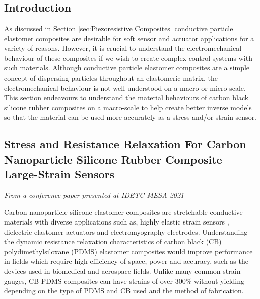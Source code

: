 \chapter{\chapiiiname}
\label{chapter3}



\section{Introduction}
As discussed in Section \ref{sec:Piezoresistive Composites} conductive particle elastomer composites are desirable for soft sensor and actuator applications for a variety of reasons. However, it is crucial to understand the electromechanical behaviour of these composites if we wish to create complex control systems with such materials. Although conductive particle elastomer composites are a simple concept of dispersing particles throughout an elastomeric matrix, the electromechanical behaviour is not well understood on a macro or micro-scale. This section endeavours to understand the material behaviours of carbon black silicone rubber composites on a macro-scale to help create better inverse models so that the material can be used more accurately as a stress and/or strain sensor. 


\section{Stress and Resistance Relaxation For Carbon Nanoparticle Silicone Rubber Composite Large-Strain Sensors}
\label{sec:Stress and Resistance Relaxation}
\textit{From a conference paper presented at IDETC-MESA 2021}

Carbon nanoparticle-silicone elastomer composites are stretchable conductive materials with diverse applications such as, highly elastic strain sensors \cite{Lacasse2010,Spahr2017,Kim2018}, dielectric elastomer actuators \cite{Henke2018,Liu2009} and electromyography electrodes\cite{Carpi2010,Kim2018,Mouri2019}. Understanding the dynamic resistance relaxation characteristics of carbon black (CB) polydimethylsiloxane (PDMS) elastomer composites would improve performance in fields which require high efficiency of space, power and accuracy, such as the devices used in biomedical and aerospace fields. Unlike many common strain gauges, CB-PDMS composites can have strains of over 300\% without yielding\cite{Wang2010} depending on the type of PDMS and CB used and the method of fabrication. 


